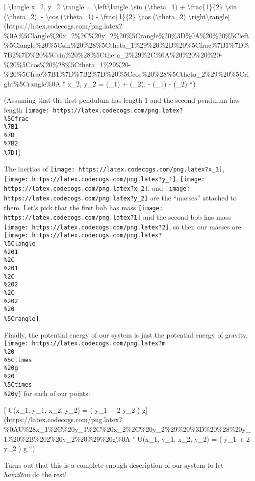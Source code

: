 \documentclass[]{article}
\begin{document}
{[} \textbackslash{}langle x\_2, y\_2 \textbackslash{}rangle =
\textbackslash{}left\textbackslash{}langle \textbackslash{}sin
(\textbackslash{}theta\_1) + \textbackslash{}frac\{1\}\{2\} \textbackslash{}sin
(\textbackslash{}theta\_2), - \textbackslash{}cos (\textbackslash{}theta\_1) -
\textbackslash{}frac\{1\}\{2\} \textbackslash{}cos (\textbackslash{}theta\_2)
\textbackslash{}right\textbackslash{}rangle{]}(https://latex.codecogs.com/png.latex?\%0A\%5Clangle\%20x\_2\%2C\%20y\_2\%20\%5Crangle\%20\%3D\%0A\%20\%20\%5Cleft\%5Clangle\%20\%5Csin\%20\%28\%5Ctheta\_1\%29\%20\%2B\%20\%5Cfrac\%7B1\%7D\%7B2\%7D\%20\%5Csin\%20\%28\%5Ctheta\_2\%29\%2C\%0A\%20\%20\%20\%20-\%20\%5Ccos\%20\%28\%5Ctheta\_1\%29\%20-\%20\%5Cfrac\%7B1\%7D\%7B2\%7D\%20\%5Ccos\%20\%28\%5Ctheta\_2\%29\%20\%5Cright\%5Crangle\%0A
" \langle x\_2, y\_2 \rangle = \left\langle \sin (\theta\_1) + 
\sin (\theta\_2), - \cos (\theta\_1) -  \cos (\theta\_2)
\right\rangle ``)

(Assuming that the first pendulum has length 1 and the second pendulum has
length
\texttt{[image: https://latex.codecogs.com/png.latex?\\\%5Cfrac\\\%7B1\\\%7D\\\%7B2\\\%7D]})

The inertias of \texttt{[image: https://latex.codecogs.com/png.latex?x\_1]},
\texttt{[image: https://latex.codecogs.com/png.latex?y\_1]},
\texttt{[image: https://latex.codecogs.com/png.latex?x\_2]}, and
\texttt{[image: https://latex.codecogs.com/png.latex?y\_2]} are the ``masses''
attached to them. Let's pick that the first bob has mass
\texttt{[image: https://latex.codecogs.com/png.latex?1]} and the second bob has
mass \texttt{[image: https://latex.codecogs.com/png.latex?2]}, so then our
masses are
\texttt{[image: https://latex.codecogs.com/png.latex?\\\%5Clangle\\\%201\\\%2C\\\%201\\\%2C\\\%202\\\%2C\\\%202\\\%20\\\%5Crangle]}.

Finally, the potential energy of our system is just the potential energy of
gravity,
\texttt{[image: https://latex.codecogs.com/png.latex?m\\\%20\\\%5Ctimes\\\%20g\\\%20\\\%5Ctimes\\\%20y]}
for each of our points:

{[} U(x\_1, y\_1, x\_2, y\_2) = ( y\_1 + 2 y\_2 )
g{]}(https://latex.codecogs.com/png.latex?\%0AU\%28x\_1\%2C\%20y\_1\%2C\%20x\_2\%2C\%20y\_2\%29\%20\%3D\%20\%28\%20y\_1\%20\%2B\%202\%20y\_2\%20\%29\%20g\%0A
" U(x\_1, y\_1, x\_2, y\_2) = ( y\_1 + 2 y\_2 ) g ``)

Turns out that this is a complete enough description of our system to let
\emph{hamilton} do the rest!
\end{document}
